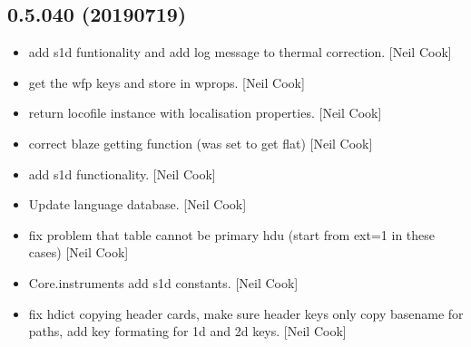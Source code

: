 \documentclass[a4paper,10pt,english]{report}
\begin{document}
\subsection{0.5.040 (2019\sphinxhyphen{}07\sphinxhyphen{}19)}
\label{\detokenize{misc/changelog:id120}}\begin{itemize}
\item {} 
 \sphinxhyphen{} add s1d funtionality and add log message
to thermal correction. {[}Neil Cook{]}

\item {} 
 \sphinxhyphen{} get the wfp keys and store in wprops. {[}Neil
Cook{]}

\item {} 
 \sphinxhyphen{} return locofile instance with
localisation properties. {[}Neil Cook{]}

\item {} 
 \sphinxhyphen{} correct blaze getting function (was set
to get flat) {[}Neil Cook{]}

\item {} 
 \sphinxhyphen{} add s1d functionality. {[}Neil Cook{]}

\item {} 
Update language database. {[}Neil Cook{]}

\item {} 
 \sphinxhyphen{} fix problem that table cannot be primary hdu (start from
ext=1 in these cases) {[}Neil Cook{]}

\item {} 
Core.instruments \sphinxhyphen{} add s1d constants. {[}Neil Cook{]}

\item {} 
 \sphinxhyphen{} fix hdict copying header cards, make sure header keys
only copy basename for paths, add key formating for 1d and 2d keys.
{[}Neil Cook{]}

\end{itemize}
\end{document}
